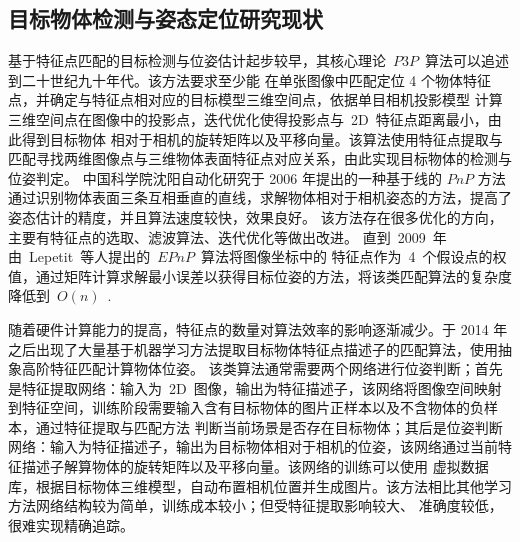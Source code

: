 \subsection{目标物体检测与姿态定位研究现状}
\label{sec:detection_status}
基于特征点匹配的目标检测与位姿估计起步较早，其核心理论~$P3P$~算法可以追述到二十世纪九十年代。该方法要求至少能
在单张图像中匹配定位 4 个物体特征点，并确定与特征点相对应的目标模型三维空间点，依据单目相机投影模型
计算三维空间点在图像中的投影点，迭代优化使得投影点与~2D~特征点距离最小，由此得到目标物体
相对于相机的旋转矩阵以及平移向量。该算法使用特征点提取与匹配寻找两维图像点与三维物体表面特征点对应关系，由此实现目标物体的检测与位姿判定。
中国科学院沈阳自动化研究于 2006 年提出的一种基于线的 $PnP$ 方法通过识别物体表面三条互相垂直的直线，求解物体相对于相机姿态的方法\cite{QinYiChongQueDingWuTiZiTaiDeBiShiJieFangFa2006}，提高了姿态估计的精度，并且算法速度较快，效果良好。
该方法存在很多优化的方向，主要有特征点的选取\cite{NayarRealtime100Object1996,ViolaRapidObjectDetection2001,SkrypnykSceneModellingRecognition2004,JiaJiYuJiHeGuanXiYueShuDeTeZhengDianPiPeiSuanFa2015}、滤波算法\cite{LoweObjectRecognitionLocal1999,MikolajczykAffineInvariantInterest2002,YiJiYuTeZhengDianDeTuXiangPeiZhunJiQiZaiWenXiangZhongDeYingYong2013}、迭代优化\cite{LuFastGloballyConvergent2000,AnsarLinearPoseEstimation2003,GaoCompleteSolutionClassification2003}等做出改进。
直到~2009~年由~Lepetit~等人提出的~$EPnP$~算法\cite{LepetitEpnpAccurateSolution2009}将图像坐标中的
特征点作为~4~个假设点的权值，通过矩阵计算求解最小误差以获得目标位姿的方法，将该类匹配算法的复杂度降低到~$O(n)$~.

随着硬件计算能力的提高，特征点的数量对算法效率的影响逐渐减少。于 2014 年之后出现了大量基于机器学习方法提取目标物体特征点描述子的匹配算法，使用抽象高阶特征匹配计算物体位姿\cite{GirshickRichFeatureHierarchies2014,GaninUnsupervisedDomainAdaptation2014,GengJiYuTouShiBuBianErZhiTeZhengMiaoShuZiDeTuXiangPiPeiSuanFa2015,HuDeepTransferMetric2015,RadFeatureMappingLearning2017,RozantsevSharingWeightsDeep2018}。
该类算法通常需要两个网络进行位姿判断；首先是特征提取网络：输入为~2D~图像，输出为特征描述子，该网络将图像空间映射到特征空间，训练阶段需要输入含有目标物体的图片正样本以及不含物体的负样本，通过特征提取与匹配方法
判断当前场景是否存在目标物体；其后是位姿判断网络：输入为特征描述子，输出为目标物体相对于相机的位姿，该网络通过当前特征描述子解算物体的旋转矩阵以及平移向量。该网络的训练可以使用
虚拟数据库，根据目标物体三维模型，自动布置相机位置并生成图片\cite{HinterstoisserPreTrainedImageFeatures2017,KehlSSD6DMakingRGBbased2017}。该方法相比其他学习方法网络结构较为简单，训练成本较小；但受特征提取影响较大、
准确度较低，很难实现精确追踪。

